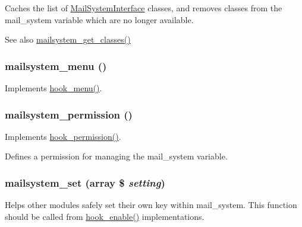 Caches the list of \hyperlink{interfaceMailSystemInterface}{MailSystemInterface} classes, and removes classes from the mail\_\-system variable which are no longer available.

\begin{DoxySeeAlso}{See also}
\hyperlink{mailsystem_8module_aa0df7ed89cbad0a84bc5da2b5d8f551a}{mailsystem\_\-get\_\-classes()} 
\end{DoxySeeAlso}
\hypertarget{mailsystem_8module_a5540af016c9247e7f9505ebcb1a8883b}{
\subsubsection[{mailsystem\_\-menu}]{\setlength{\rightskip}{0pt plus 5cm}mailsystem\_\-menu ()}}
\label{mailsystem_8module_a5540af016c9247e7f9505ebcb1a8883b}
Implements \hyperlink{group__hooks_ga5c95244fea59b25666e409759e133ded}{hook\_\-menu()}. \hypertarget{mailsystem_8module_a661f773ba0f39c8574a74280c979660f}{
\subsubsection[{mailsystem\_\-permission}]{\setlength{\rightskip}{0pt plus 5cm}mailsystem\_\-permission ()}}
\label{mailsystem_8module_a661f773ba0f39c8574a74280c979660f}
Implements \hyperlink{group__hooks_ga2b22b45f4925f2478412477bae329713}{hook\_\-permission()}.

Defines a permission for managing the mail\_\-system variable. \hypertarget{mailsystem_8module_a2b62d67e268ecc0f8302ac7043d71927}{
\subsubsection[{mailsystem\_\-set}]{\setlength{\rightskip}{0pt plus 5cm}mailsystem\_\-set (array \$ {\em setting})}}
\label{mailsystem_8module_a2b62d67e268ecc0f8302ac7043d71927}
Helps other modules safely set their own key within mail\_\-system. This function should be called from \hyperlink{group__hooks_gaedcfb58c08d5c5f8ffcd1059ceeb39e4}{hook\_\-enable()} implementations.


